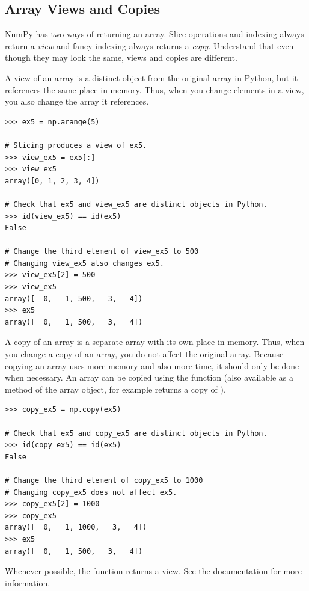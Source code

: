\subsection*{Array Views and Copies} %
NumPy has two ways of returning an array. Slice operations and indexing always return
a \emph{view} and fancy indexing always returns a \emph{copy}.
Understand that even though they may look the same, views and copies are different.

A view of an array is a distinct object from the original array in Python, but it references the same place in memory. 
Thus, when you change elements in a view, you also change the array it references.
\begin{lstlisting}
>>> ex5 = np.arange(5)

# Slicing produces a view of ex5. 
>>> view_ex5 = ex5[:]
>>> view_ex5
array([0, 1, 2, 3, 4])

# Check that ex5 and view_ex5 are distinct objects in Python.
>>> id(view_ex5) == id(ex5) 
False

# Change the third element of view_ex5 to 500
# Changing view_ex5 also changes ex5.
>>> view_ex5[2] = 500 
>>> view_ex5
array([  0,   1, 500,   3,   4])
>>> ex5 
array([  0,   1, 500,   3,   4])
\end{lstlisting} 

A copy of an array is a separate array with its own place in memory. 
Thus, when you change a copy of an array, you do not affect the original array. 
Because copying an array uses more memory and also more time, it should only be done when necessary. 
An array can be copied using the  function (also available as a method of the array object, for example  returns a copy of ). 

\begin{lstlisting}
>>> copy_ex5 = np.copy(ex5) 

# Check that ex5 and copy_ex5 are distinct objects in Python.
>>> id(copy_ex5) == id(ex5) 
False

# Change the third element of copy_ex5 to 1000
# Changing copy_ex5 does not affect ex5.
>>> copy_ex5[2] = 1000 
>>> copy_ex5
array([  0,   1, 1000,   3,   4])
>>> ex5
array([  0,   1, 500,   3,   4])
\end{lstlisting} 

Whenever possible, the function  returns a view. 
See the documentation for more information.

